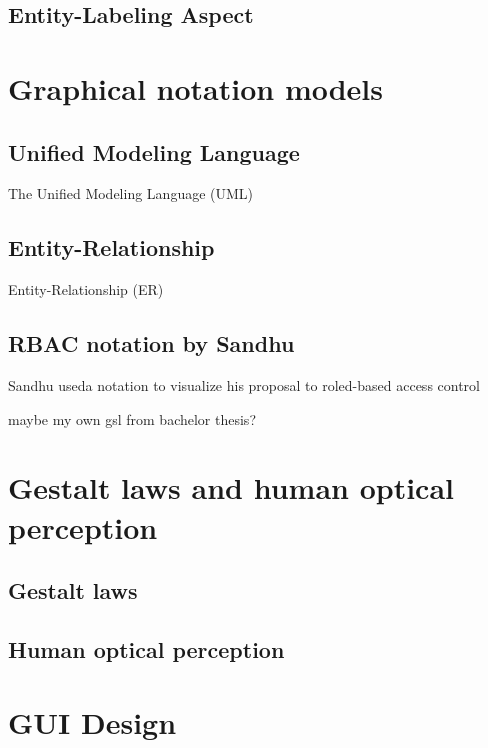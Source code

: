 \documentclass[twoside, openright, 12pt]{book}
\begin{document}
\subsection{Entity-Labeling Aspect}
\label{EL}




\section{Graphical notation models}
\label{graphical_notations}

\subsection{Unified Modeling Language}
\label{UML}
The Unified Modeling Language (UML)

\subsection{Entity-Relationship}
\label{ER}
Entity-Relationship (ER)

\subsection{RBAC notation by Sandhu}
\label{RBAC_notation}
Sandhu useda notation to visualize his proposal to roled-based access control

maybe my own gsl from bachelor thesis?



\section{Gestalt laws and human optical perception}
\label{gestalt_laws_and_human_optical_perception}


\subsection{Gestalt laws}
\label{gestalt_laws}


\subsection{Human optical perception}
\label{human_optical_perception}




\section{GUI Design}
\label{gui_design}
\end{document}
